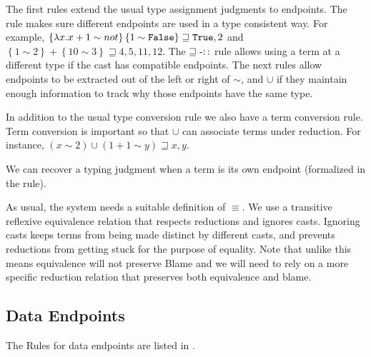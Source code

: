 The first rules extend the usual type assignment judgments to endpoints.
The  rule makes sure different endpoints are used in a type consistent way.
For example, $\left\{ \lambda x.x+1\sim not\right\} \left\{ 1\sim \mathtt{False}{} \right\} \sqsupseteq \mathtt{True}{} ,2$ and $\left\{ 1\sim2\right\} +\left\{ 10\sim3\right\} \sqsupseteq4,5,11,12$.
The $\operatorname{\sqsupseteq-::}$ rule allows using a term at a different type if the cast has compatible endpoints.
The next rules allow endpoints to be extracted out of the left or right of $\sim$, and $\cup$ if they maintain enough information to track why those endpoints have the same type.

In addition to the usual type conversion rule we also have a term conversion rule.
Term conversion is important so that $\cup$ can associate terms under reduction.
For instance, $\left(x\sim2\right)\cup\left(1+1\sim y\right)\sqsupseteq x, y$.

We can recover a typing judgment when a term is its own endpoint (formalized in the  rule).
 
As usual, the system needs a suitable definition of $\equiv$.
We use a transitive reflexive equivalence relation that respects reductions and ignores casts.
Ignoring casts keeps terms from being made distinct by different casts, and prevents reductions from getting stuck for the purpose of equality.
Note that unlike  this means equivalence will not preserve Blame and we will need to rely on a more specific reduction relation that preserves both equivalence and blame.


\subsection{Data Endpoints}

The Rules for data endpoints are listed in .


